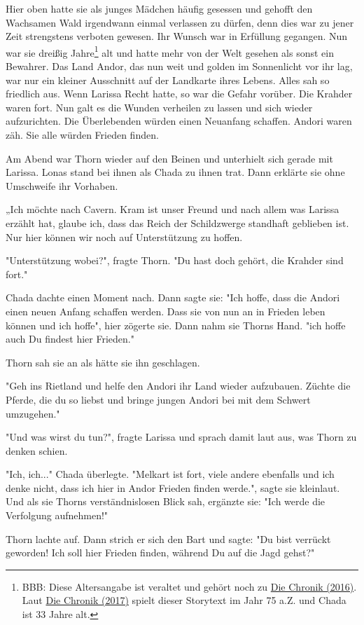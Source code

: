 \documentclass[10pt, a4paper, oneside]{book}
\newcommand{\refprodukt}[1]{\hyperref[Produkt: #1]{#1}}
\begin{document}
\begin{multicols}{2}
Hier oben hatte sie als junges Mädchen häufig gesessen und gehofft den Wachsamen Wald irgendwann einmal verlassen zu dürfen, denn dies war zu jener Zeit strengstens verboten gewesen. Ihr Wunsch war in Erfüllung gegangen. Nun war sie dreißig Jahre\footnote{BBB: Diese Altersangabe ist veraltet und gehört noch zu \refprodukt{Die Chronik (2016)}. Laut \refprodukt{Die Chronik (2017)} spielt dieser Storytext im Jahr 75 a.Z. und Chada ist 33 Jahre alt.} alt und hatte mehr von der Welt gesehen als sonst ein Bewahrer. Das Land Andor, das nun weit und golden im Sonnenlicht vor ihr lag, war nur ein kleiner Ausschnitt auf der Landkarte ihres Lebens. Alles sah so friedlich aus. Wenn Larissa Recht hatte, so war die Gefahr vorüber. Die Krahder waren fort. Nun galt es die Wunden verheilen zu lassen und sich wieder aufzurichten. Die Überlebenden würden einen Neuanfang schaffen. Andori waren zäh. Sie alle würden Frieden finden.

Am Abend war Thorn wieder auf den Beinen und unterhielt sich gerade mit Larissa. Lonas stand bei ihnen als Chada zu ihnen trat.  Dann erklärte sie ohne Umschweife ihr Vorhaben.

„Ich möchte nach Cavern. Kram ist unser Freund und nach allem was Larissa erzählt hat, glaube ich, dass das Reich der Schildzwerge standhaft geblieben ist. Nur hier können wir noch auf Unterstützung zu hoffen.

"Unterstützung wobei?", fragte Thorn. "Du hast doch gehört, die Krahder sind fort."

Chada dachte einen Moment nach. Dann sagte sie: "Ich hoffe, dass die Andori einen neuen Anfang schaffen werden. Dass sie von nun an in Frieden leben können und ich hoffe", hier zögerte sie. Dann nahm sie Thorns Hand. "ich hoffe auch Du findest hier Frieden."

Thorn sah sie an als hätte sie ihn geschlagen.

"Geh ins Rietland und helfe den Andori ihr Land wieder aufzubauen. Züchte die Pferde, die du so liebst und bringe jungen Andori bei mit dem Schwert umzugehen."

"Und was wirst du tun?", fragte Larissa und sprach damit laut aus, was Thorn zu denken schien.

"Ich, ich..." Chada überlegte. "Melkart ist fort, viele andere ebenfalls und ich denke nicht, dass ich hier in Andor Frieden finden werde.", sagte sie kleinlaut. Und als sie Thorns verständnislosen Blick sah, ergänzte sie: "Ich werde die Verfolgung aufnehmen!"

Thorn lachte auf. Dann strich er sich den Bart und sagte: "Du bist verrückt geworden! Ich soll hier Frieden finden, während Du auf die Jagd gehst?"


\end{multicols}
\end{document}
